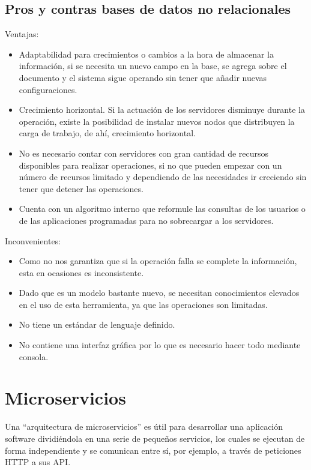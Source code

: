 \documentclass[12pt]{report} %
\begin{document}
	\subsection{Pros y contras bases de datos no relacionales}
		Ventajas:
	\begin{itemize}
		\item Adaptabilidad para crecimientos o cambios a la hora de almacenar la información, si se necesita un nuevo campo en la base, se agrega sobre el documento y el sistema sigue operando sin tener que añadir nuevas configuraciones.
		\item Crecimiento horizontal. Si la actuación de los servidores disminuye durante la operación, existe la posibilidad de instalar nuevos nodos que distribuyen la carga de trabajo, de ahí, crecimiento horizontal.
		\item No es necesario contar con servidores con gran cantidad de recursos disponibles para realizar operaciones, si no que pueden empezar con un número de recursos limitado y dependiendo de las necesidades ir creciendo sin tener que detener las operaciones.
		\item Cuenta con un algoritmo interno que reformule las consultas de los usuarios o de las aplicaciones programadas para no sobrecargar a los servidores.
	\end{itemize}
	Inconvenientes:
	\begin{itemize}
		\item Como no nos garantiza que si la operación falla se complete la información, esta en ocasiones es inconsistente.
		\item	Dado que es un modelo bastante nuevo, se necesitan conocimientos elevados en el uso de esta herramienta, ya que las operaciones son limitadas.
		\item 	No tiene un estándar de lenguaje definido.
		\item 	No contiene una interfaz gráfica por lo que es necesario hacer todo mediante consola.
	\end{itemize}

\section{Microservicios}

Una “arquitectura de microservicios” es útil para desarrollar una aplicación software dividiéndola en una serie de pequeños servicios, los cuales se ejecutan de forma independiente y se comunican entre sí, por ejemplo, a través de peticiones HTTP a sus API.
\end{document}
